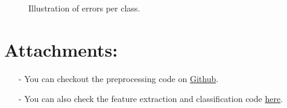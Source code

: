 \documentclass[a4paper, 11pt]{article}
\begin{document}
\begin{figure}
\begin{center}
{{\begin{subfloatrow}[4]
					\end{subfloatrow}
				}
				{
					\caption*{\label{fig::fac_samples} (iii). Samples of Facet errors.}
				}
			}
			{
				\caption{\label{fig::samples}Illustration of errors per class.}
			}
		\end{center}
	\end{figure}
	\clearpage

\section*{Attachments:}

\begin{itemize}
	\item[-] You can checkout the preprocessing code on
	\href{https://github.com/ethiy/proj.city}{Github}.
	\item[-] You can also check the feature extraction and classification code
	\href{https://github.com/ethiy/qualcity}{here}.
\end{itemize}
\end{document}
